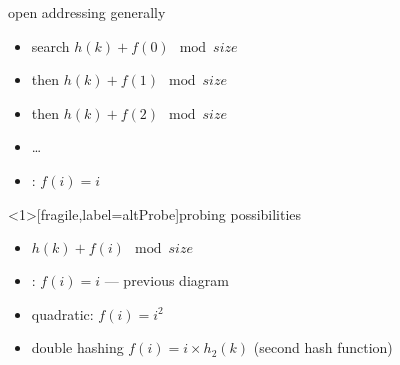 \begin{frame}{open addressing generally}
\begin{itemize}
\item search $h(k) + f(0) \mod size$
\item then $h(k) + f(1) \mod size$
\item then $h(k) + f(2) \mod size$
\item \ldots
\vspace{.5cm}
\item {}: $f(i) = i$
\end{itemize}
\end{frame}

\begin{frame}<1>[fragile,label=altProbe]{probing possibilities}
\begin{itemize}
\item $h(k) + f(i) \mod size$
\vspace{.5cm}
\item {}: $f(i) = i$ --- previous diagram
\item quadratic: $f(i) = i^2$
\item double hashing $f(i) = i\times h_2(k)$ (second hash function)
\end{itemize}
\end{frame}
